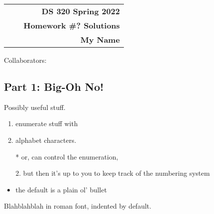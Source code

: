 \documentclass[11pt]{article}
\makeatletter
\renewcommand\maketitle{
\begin{center}
\begin{tabular*}{6.44in}{l @{\extracolsep{\fill}}c r}
\bfseries  &  & \bfseries DS 320 Spring 2022 \\
\bfseries&  & \bfseries  Homework \#? Solutions  \\
\bfseries   &   &  \bfseries My Name \\ 
\end{tabular*}
\end{center} }
\makeatother
\begin{document}
\maketitle


\noindent Collaborators:


\subsection*{Part  1: Big-Oh No!}






\vspace*{50pt}

\noindent Possibly useful stuff.

\begin{enumerate}
\item enumerate stuff with
\item alphabet characters.
\end{enumerate}

\begin{itemize}
\item[*] or, can control the enumeration,
\item[2.] but then it's up to you to keep track of the numbering system
\item the default is a plain ol' bullet
\end{itemize}

Blahblahblah in roman font, indented by default.\\ 

 
\end{document}
